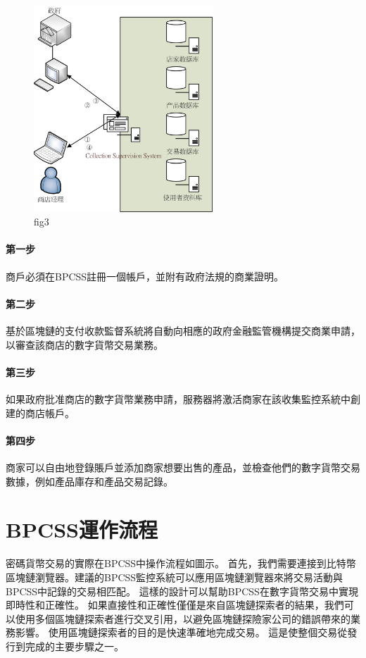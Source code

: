 	\begin{figure}[h]
		\centering
		\includegraphics[width = 0.6\textwidth]{fig3.png}
		\caption{fig3}\label{fig3}
	\end{figure}

		\paragraph{第一步}商戶必須在BPCSS註冊一個帳戶，並附有政府法規的商業證明。
		\paragraph{第二步}基於區塊鏈的支付收款監督系統將自動向相應的政府金融監管機構提交商業申請，以審查該商店的數字貨幣交易業務。
		\paragraph{第三步}如果政府批准商店的數字貨幣業務申請，服務器將激活商家在該收集監控系統中創建的商店帳戶。
		\paragraph{第四步}商家可以自由地登錄賬戶並添加商家想要出售的產品，並檢查他們的數字貨幣交易數據，例如產品庫存和產品交易記錄。

	\section{BPCSS運作流程}
	密碼貨幣交易的實際在BPCSS中操作流程如圖示。 首先，我們需要連接到比特幣區塊鏈瀏覽器。建議的BPCSS監控系統可以應用區塊鏈瀏覽器來將交易活動與BPCSS中記錄的交易相匹配。 這樣的設計可以幫助BPCSS在數字貨幣交易中實現即時性和正確性。 如果直接性和正確性僅僅是來自區塊鏈探索者的結果，我們可以使用多個區塊鏈探索者進行交叉引用，以避免區塊鏈探險家公司的錯誤帶來的業務影響。 使用區塊鏈探索者的目的是快速準確地完成交易。 這是使整個交易從發行到完成的主要步驟之一。
	

